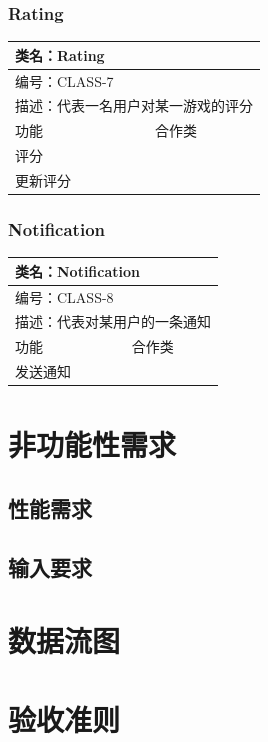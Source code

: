 \documentclass[12pt]{ctexart} %
\begin{document}
\subsubsection{Rating}
\begin{tabular}{|l|l|}
  \hline
  \multicolumn{2}{|l|}{类名：Rating} \\
  \hline
  \multicolumn{2}{|l|}{编号：CLASS-7} \\
  \hline
  \multicolumn{2}{|l|}{描述：代表一名用户对某一游戏的评分} \\
  \hline
  功能 & 合作类 \\
  \hline
  评分 & \\
  \hline
  更新评分 & \\
  \hline
  \end{tabular}

\subsubsection{Notification}
\begin{tabular}{|l|l|}
  \hline
  \multicolumn{2}{|l|}{类名：Notification} \\
  \hline
  \multicolumn{2}{|l|}{编号：CLASS-8} \\
  \hline
  \multicolumn{2}{|l|}{描述：代表对某用户的一条通知} \\
  \hline
  功能 & 合作类 \\
  \hline
  发送通知 & \\
  \hline
  \end{tabular}

\section{非功能性需求}
\subsection{性能需求}

\subsection{输入要求}


\section{数据流图}

\section{验收准则}
\end{document}
